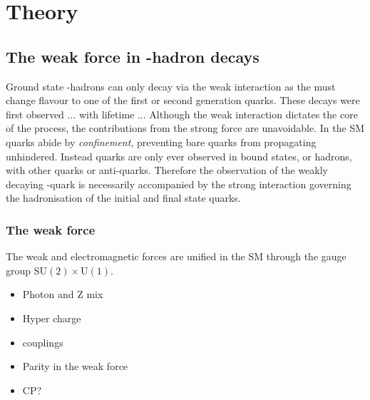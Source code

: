 \chapter{Theory} 
\label{ch:theory}

\minitoc





\section{The weak force in \bquark-hadron decays}

Ground state \bquark-hadrons can only decay via the weak interaction as the \bquark must change flavour to one of the first or second generation quarks.
These decays were first observed ... with lifetime ...
Although the weak interaction dictates the core of the process, the contributions from the strong force are unavoidable. In the SM quarks abide by \emph{confinement}, preventing bare quarks from propagating unhindered. Instead quarks are only ever observed in bound states, or hadrons, with other quarks or anti-quarks. Therefore the observation of the weakly decaying \bquark-quark is necessarily accompanied by the strong interaction governing the hadronisation of the initial and final state quarks.


\subsection{The weak force}

The weak and electromagnetic forces are unified in the SM through the gauge group $\text{SU}(2)\times\text{U}(1)$.

{\color{Red}
\begin{itemize}
\item Photon and Z mix
\item Hyper charge
\item couplings
\item Parity in the weak force
\item CP? 
\end{itemize}}

